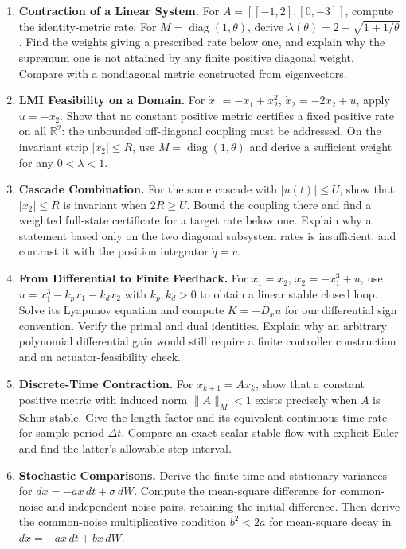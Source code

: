 \begin{enumerate}
\item \textbf{Contraction of a Linear System.} For $A=[[-1,2],[0,-3]]$, compute the identity-metric rate. For $M=\operatorname{diag}(1,\theta)$, derive $\lambda(\theta)=2-\sqrt{1+1/\theta}$. Find the weights giving a prescribed rate below one, and explain why the supremum one is not attained by any finite positive diagonal weight. Compare with a nondiagonal metric constructed from eigenvectors.
\item \textbf{LMI Feasibility on a Domain.} For $\dot x_1=-x_1+x_2^2$, $\dot x_2=-2x_2+u$, apply $u=-x_2$. Show that no constant positive metric certifies a fixed positive rate on all $\mathbb R^2$: the unbounded off-diagonal coupling must be addressed. On the invariant strip $|x_2|\leq R$, use $M=\operatorname{diag}(1,\theta)$ and derive a sufficient weight for any $0<\lambda<1$.
\item \textbf{Cascade Combination.} For the same cascade with $|u(t)|\leq U$, show that $|x_2|\leq R$ is invariant when $2R\geq U$. Bound the coupling there and find a weighted full-state certificate for a target rate below one. Explain why a statement based only on the two diagonal subsystem rates is insufficient, and contrast it with the position integrator $\dot q=v$.
\item \textbf{From Differential to Finite Feedback.} For $\dot x_1=x_2$, $\dot x_2=-x_1^3+u$, use $u=x_1^3-k_px_1-k_dx_2$ with $k_p,k_d>0$ to obtain a linear stable closed loop. Solve its Lyapunov equation and compute $K=-D_xu$ for our differential sign convention. Verify the primal and dual identities. Explain why an arbitrary polynomial differential gain would still require a finite controller construction and an actuator-feasibility check.
\item \textbf{Discrete-Time Contraction.} For $x_{k+1}=Ax_k$, show that a constant positive metric with induced norm $\|A\|_M<1$ exists precisely when $A$ is Schur stable. Give the length factor and its equivalent continuous-time rate for sample period $\Delta t$. Compare an exact scalar stable flow with explicit Euler and find the latter's allowable step interval.
\item \textbf{Stochastic Comparisons.} Derive the finite-time and stationary variances for $dx=-ax\,dt+\sigma\,dW$. Compute the mean-square difference for common-noise and independent-noise pairs, retaining the initial difference. Then derive the common-noise multiplicative condition $b^2<2a$ for mean-square decay in $dx=-ax\,dt+bx\,dW$.

\end{enumerate}

